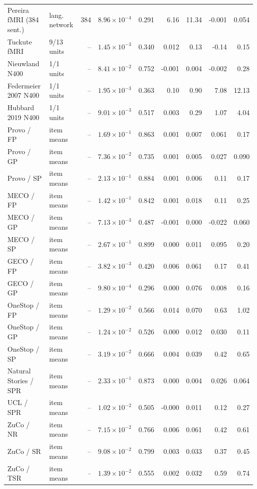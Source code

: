 {\begin{longtable}{@{}llrrrrrrr@{}}
Pereira fMRI (384 sent.) & lang. network & 384 & $8.96\times10^{-4}$ & 0.291 & 6.16 & 11.34 & -0.001 & 0.054 \\
Tuckute fMRI & 9/13 units & -- & $1.45\times10^{-3}$ & 0.340 & 0.012 & 0.13 & -0.14 & 0.15 \\
Nieuwland N400 & 1/1 units & -- & $8.41\times10^{-2}$ & 0.752 & -0.001 & 0.004 & -0.002 & 0.28 \\
Federmeier 2007 N400 & 1/1 units & -- & $1.95\times10^{-3}$ & 0.363 & 0.10 & 0.90 & 7.08 & 12.13 \\
Hubbard 2019 N400 & 1/1 units & -- & $9.01\times10^{-3}$ & 0.517 & 0.003 & 0.29 & 1.07 & 4.04 \\
\midrule
Provo / FP & item means & -- & $1.69\times10^{-1}$ & 0.863 & 0.001 & 0.007 & 0.061 & 0.17 \\
Provo / GP & item means & -- & $7.36\times10^{-2}$ & 0.735 & 0.001 & 0.005 & 0.027 & 0.090 \\
Provo / SP & item means & -- & $2.13\times10^{-1}$ & 0.884 & 0.001 & 0.006 & 0.11 & 0.17 \\
MECO / FP & item means & -- & $1.42\times10^{-1}$ & 0.842 & 0.001 & 0.018 & 0.11 & 0.25 \\
MECO / GP & item means & -- & $7.13\times10^{-3}$ & 0.487 & -0.001 & 0.000 & -0.022 & 0.060 \\
MECO / SP & item means & -- & $2.67\times10^{-1}$ & 0.899 & 0.000 & 0.011 & 0.095 & 0.20 \\
GECO / FP & item means & -- & $3.82\times10^{-3}$ & 0.420 & 0.006 & 0.061 & 0.17 & 0.41 \\
GECO / GP & item means & -- & $9.80\times10^{-4}$ & 0.296 & 0.000 & 0.076 & 0.008 & 0.16 \\
OneStop / FP & item means & -- & $1.29\times10^{-2}$ & 0.566 & 0.014 & 0.070 & 0.63 & 1.02 \\
OneStop / GP & item means & -- & $1.24\times10^{-2}$ & 0.526 & 0.000 & 0.012 & 0.030 & 0.11 \\
OneStop / SP & item means & -- & $3.19\times10^{-2}$ & 0.666 & 0.004 & 0.039 & 0.42 & 0.65 \\
Natural Stories / SPR & item means & -- & $2.33\times10^{-1}$ & 0.873 & 0.000 & 0.004 & 0.026 & 0.064 \\
UCL / SPR & item means & -- & $1.02\times10^{-2}$ & 0.505 & -0.000 & 0.011 & 0.12 & 0.27 \\
ZuCo / NR & item means & -- & $7.15\times10^{-2}$ & 0.766 & 0.006 & 0.061 & 0.42 & 0.61 \\
ZuCo / SR & item means & -- & $9.08\times10^{-2}$ & 0.799 & 0.003 & 0.033 & 0.37 & 0.45 \\
ZuCo / TSR & item means & -- & $1.39\times10^{-2}$ & 0.555 & 0.002 & 0.032 & 0.59 & 0.74 \\
\end{longtable}
}
